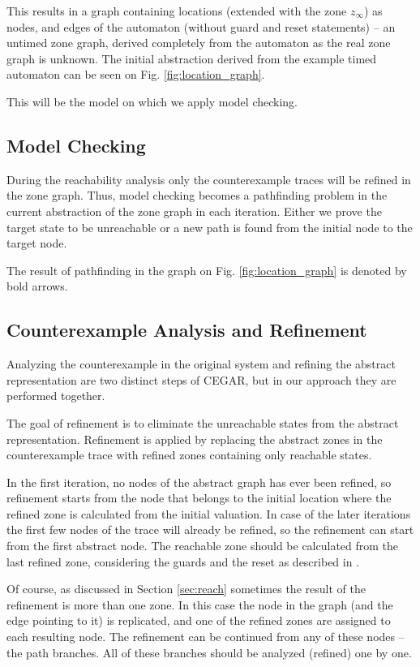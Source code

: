 This results in a graph containing locations (extended with the zone
$z_\infty$) as nodes, and edges of the automaton (without guard and reset statements) --
an untimed zone graph, derived completely from the automaton as the real zone
graph is unknown. The initial abstraction derived from the example timed automaton can be
seen on Fig. \ref{fig:location_graph}.

This will be the model on which we apply model checking.%


\subsection{Model Checking} During the reachability analysis only the counterexample traces will be refined in the zone graph. Thus, model checking becomes a pathfinding problem in the current abstraction of the zone graph in each iteration. Either we prove the target state to be unreachable or a new path is found from the initial node to the target node.

The result of pathfinding in the graph on Fig. \ref{fig:location_graph} is denoted by bold arrows.

\subsection{Counterexample Analysis and Refinement} Analyzing the counterexample in the
original system and refining the abstract representation are two distinct steps of
CEGAR, but in our approach they are performed together.

The goal of refinement is to eliminate the unreachable states from the abstract representation.
Refinement is applied by replacing the abstract zones in the counterexample trace with refined zones containing only reachable states. 

In the first iteration, no nodes of the abstract graph has ever been refined,
so refinement starts from the node that belongs to the initial location where the refined zone is calculated from the initial valuation. In case of the later iterations the first few nodes of the
trace will already be refined, so the refinement can start from the first
abstract node. The reachable zone should be calculated from the last refined zone,
considering the guards and the reset as described in \cite{bengtsson2004timed}.

Of course, as discussed in Section \ref{sec:reach} sometimes the result of the refinement is
more than one zone. In this case the node in the graph (and the edge pointing
to it) is replicated, and one of the refined zones are assigned
to each resulting node. The refinement can be continued from any of these nodes -- the path branches.
All of these branches should be analyzed (refined) one by one.



